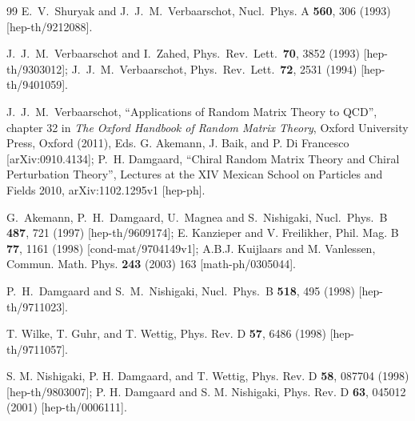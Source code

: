 \documentclass[11pt]{article}
\begin{document}
\begin{thebibliography}{99}
  E.~V.~Shuryak and J.~J.~M.~Verbaarschot,
  Nucl.\ Phys. A {\bf 560}, 306 (1993)
  [hep-th/9212088].

  J.~J.~M.~Verbaarschot and I.~Zahed,
  Phys.\ Rev.\ Lett.\  {\bf 70}, 3852 (1993)
  [hep-th/9303012];
  J.~J.~M.~Verbaarschot,
  Phys.\ Rev.\ Lett.\  {\bf 72}, 2531 (1994)
  [hep-th/9401059].

  J.~J.~M.~Verbaarschot, ``Applications of Random Matrix Theory to QCD'',
chapter 32 in {\it The Oxford Handbook of Random Matrix Theory}, 
Oxford University Press, Oxford (2011),
Eds. G. Akemann,
J. Baik, and P. Di Francesco  
[arXiv:0910.4134];
\newline
P.~H. Damgaard, ``Chiral Random Matrix Theory and Chiral Perturbation
Theory'',
Lectures at the XIV Mexican School on Particles and Fields 2010,
arXiv:1102.1295v1 [hep-ph]. 

  G.~Akemann, P.~H.~Damgaard, U.~Magnea and S.~Nishigaki,
  Nucl.\ Phys.\  B {\bf 487}, 721 (1997)
  [hep-th/9609174];\newline
E. Kanzieper and V. Freilikher,
Phil. Mag. B {\bf 77}, 1161 (1998)
[cond-mat/9704149v1];\newline
A.B.J. Kuijlaars and M. Vanlessen, Commun. Math. Phys. {\bf 243}
(2003) 163 [math-ph/0305044].

 P.~H.~Damgaard and S.~M.~Nishigaki,
  Nucl.\ Phys.\  B {\bf 518}, 495 (1998)
  [hep-th/9711023].

T. Wilke, T. Guhr, and T. Wettig, 
{ Phys. Rev. D} {\bf 57}, 6486 (1998)
  [hep-th/9711057].

 S. M. Nishigaki, P. H. Damgaard, and T. Wettig, 
{    Phys. Rev. D} {\bf 58}, 087704 (1998) [hep-th/9803007];\newline
%
P. H. Damgaard and S. M. Nishigaki, %
{ Phys. Rev. D} {\bf 63}, 045012
(2001) 
  [hep-th/0006111].


\end{thebibliography}
\end{document}
